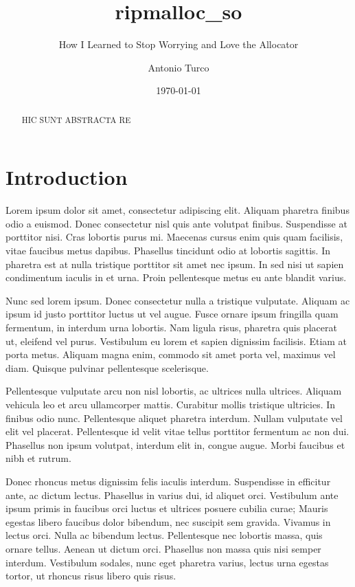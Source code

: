 \documentclass[noexaminfo]{sapthesis}  %
\title{ripmalloc\_so}
\subtitle{How I Learned to Stop Worrying and Love the Allocator}
\author{Antonio Turco}
\date{\today}
\begin{document}
\frontmatter  
\maketitle
\dedication{Dedicato a...}

\begin{abstract}
HIC SUNT ABSTRACTA RE
\end{abstract}

\tableofcontents

\mainmatter   %
\chapter{Introduction}
Lorem ipsum dolor sit amet, consectetur adipiscing elit. Aliquam pharetra finibus odio a euismod. Donec consectetur nisl quis ante volutpat finibus. Suspendisse at porttitor nisi. Cras lobortis purus mi. Maecenas cursus enim quis quam facilisis, vitae faucibus metus dapibus. Phasellus tincidunt odio at lobortis sagittis. In pharetra est at nulla tristique porttitor sit amet nec ipsum. In sed nisi ut sapien condimentum iaculis in et urna. Proin pellentesque metus eu ante blandit varius.

Nunc sed lorem ipsum. Donec consectetur nulla a tristique vulputate. Aliquam ac ipsum id justo porttitor luctus ut vel augue. Fusce ornare ipsum fringilla quam fermentum, in interdum urna lobortis. Nam ligula risus, pharetra quis placerat ut, eleifend vel purus. Vestibulum eu lorem et sapien dignissim facilisis. Etiam at porta metus. Aliquam magna enim, commodo sit amet porta vel, maximus vel diam. Quisque pulvinar pellentesque scelerisque.

Pellentesque vulputate arcu non nisl lobortis, ac ultrices nulla ultrices. Aliquam vehicula leo et arcu ullamcorper mattis. Curabitur mollis tristique ultricies. In finibus odio nunc. Pellentesque aliquet pharetra interdum. Nullam vulputate vel elit vel placerat. Pellentesque id velit vitae tellus porttitor fermentum ac non dui. Phasellus non ipsum volutpat, interdum elit in, congue augue. Morbi faucibus et nibh et rutrum.

Donec rhoncus metus dignissim felis iaculis interdum. Suspendisse in efficitur ante, ac dictum lectus. Phasellus in varius dui, id aliquet orci. Vestibulum ante ipsum primis in faucibus orci luctus et ultrices posuere cubilia curae; Mauris egestas libero faucibus dolor bibendum, nec suscipit sem gravida. Vivamus in lectus orci. Nulla ac bibendum lectus. Pellentesque nec lobortis massa, quis ornare tellus. Aenean ut dictum orci. Phasellus non massa quis nisi semper interdum. Vestibulum sodales, nunc eget pharetra varius, lectus urna egestas tortor, ut rhoncus risus libero quis risus.
\end{document}
